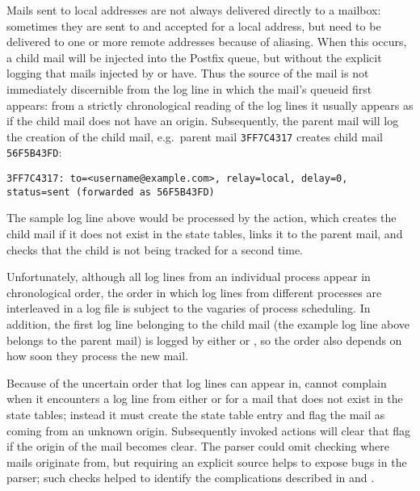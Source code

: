Mails sent to local addresses are not always delivered directly to a
mailbox: sometimes they are sent to and accepted for a local address, but
need to be delivered to one or more remote addresses because of aliasing.
When this occurs, a child mail will be injected into the Postfix queue, but
without the explicit logging that mails injected by  or
 have.  Thus the source of the mail is not immediately
discernible from the log line in which the mail's queueid first appears:
from a strictly chronological reading of the log lines it usually appears
as if the child mail does not have an origin.  Subsequently, the parent
mail will log the creation of the child mail, e.g.\ parent mail
\texttt{3FF7C4317} creates child mail \texttt{56F5B43FD}\@:

\texttt{3FF7C4317: to=<username@example.com>, relay=local, \hfill{}
\newline{} \tab{} \tab{} delay=0, status=sent (forwarded as 56F5B43FD)}

The sample log line above would be processed by the  action,
which creates the child mail if it does not exist in the state tables,
links it to the parent mail, and checks that the child is not being tracked
for a second time.

Unfortunately, although all log lines from an individual process appear in
chronological order, the order in which log lines from different processes
are interleaved in a log file is subject to the vagaries of process
scheduling.  In addition, the first log line belonging to the child mail
(the example log line above belongs to the parent mail) is logged by either
 or , so the order also depends on how soon
they process the new mail.

Because of the uncertain order that log lines can appear in, \parsername{}
cannot complain when it encounters a log line from either  or
 for a mail that does not exist in the state tables;
instead it must create the state table entry and flag the mail as coming
from an unknown origin.  Subsequently invoked actions will clear that flag
if the origin of the mail becomes clear.  The parser could omit checking
where mails originate from, but requiring an explicit source helps to
expose bugs in the parser; such checks helped to identify the complications
described in  and
.

